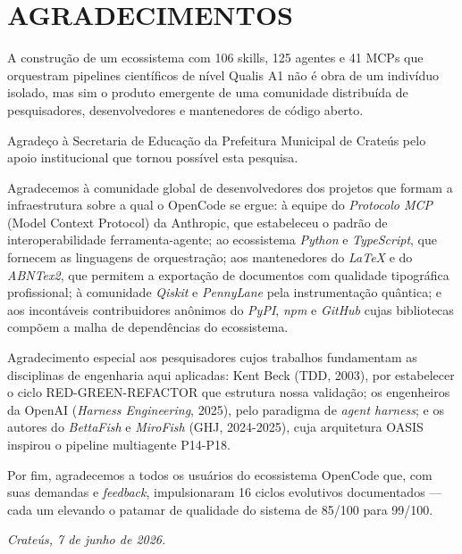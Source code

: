 \chapter*{AGRADECIMENTOS}
\thispagestyle{empty}

A construção de um ecossistema com 106 skills, 125 agentes e 41 MCPs que orquestram pipelines científicos de nível Qualis A1 não é obra de um indivíduo isolado, mas sim o produto emergente de uma comunidade distribuída de pesquisadores, desenvolvedores e mantenedores de código aberto.

Agradeço à Secretaria de Educação da Prefeitura Municipal de Crateús pelo apoio institucional que tornou possível esta pesquisa.

Agradecemos à comunidade global de desenvolvedores dos projetos que formam a infraestrutura sobre a qual o OpenCode se ergue: à equipe do \textit{Protocolo MCP} (Model Context Protocol) da Anthropic, que estabeleceu o padrão de interoperabilidade ferramenta-agente; ao ecossistema \textit{Python} e \textit{TypeScript}, que fornecem as linguagens de orquestração; aos mantenedores do \textit{LaTeX} e do \textit{ABNTex2}, que permitem a exportação de documentos com qualidade tipográfica profissional; à comunidade \textit{Qiskit} e \textit{PennyLane} pela instrumentação quântica; e aos incontáveis contribuidores anônimos do \textit{PyPI}, \textit{npm} e \textit{GitHub} cujas bibliotecas compõem a malha de dependências do ecossistema.

Agradecimento especial aos pesquisadores cujos trabalhos fundamentam as disciplinas de engenharia aqui aplicadas: Kent Beck (TDD, 2003), por estabelecer o ciclo RED-GREEN-REFACTOR que estrutura nossa validação; os engenheiros da OpenAI (\textit{Harness Engineering}, 2025), pelo paradigma de \textit{agent harness}; e os autores do \textit{BettaFish} e \textit{MiroFish} (GHJ, 2024-2025), cuja arquitetura OASIS inspirou o pipeline multiagente P14-P18.

Por fim, agradecemos a todos os usuários do ecossistema OpenCode que, com suas demandas e \textit{feedback}, impulsionaram 16 ciclos evolutivos documentados --- cada um elevando o patamar de qualidade do sistema de 85/100 para 99/100.

\vspace{1cm}
\begin{flushright}
  \textit{Crateús, 7 de junho de 2026.}
\end{flushright}
\newpage
